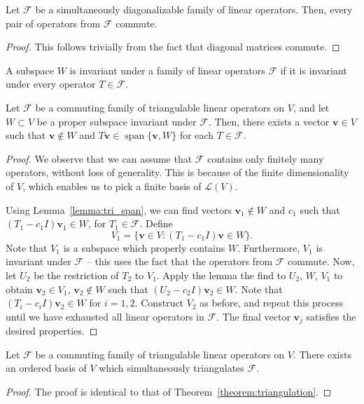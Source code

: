 \documentclass[11pt]{article}
\renewcommand{\vec}[1]{\boldsymbol{#1}}
\newcommand{\vv}{\vec{v}}
\newcommand{\alg}[1]{\mathscr{#1}}
\newcommand{\algL}{\alg{L}}
\newcommand{\algF}{\alg{F}}
\newcommand{\spn}{\operatorname{span}}
\theoremstyle{definition}
\theoremstyle{remark}
\numberwithin{equation}{section}
\begin{document}
    \begin{lemma}
        Let $\algF$ be a simultaneously diagonalizable family of linear
        operators. Then, every pair of operators from $\algF$ commute.
    \end{lemma}
    \begin{proof}
        This follows trivially from the fact that diagonal matrices commute.
    \end{proof}

    \begin{definition}
        A subspace $W$ is invariant under a family of linear operators $\algF$
        if it is invariant under every operator $T \in \algF$.
    \end{definition}

    \begin{lemma}
        Let $\algF$ be a commuting family of triangulable linear operators on
        $V$, and let $W \subset V$ be a proper subspace invariant under
        $\algF$. Then, there exists a vector $\vv \in V$ such that $\vv \notin
        W$ and $T\vv \in \spn\{\vv, W\}$ for each $T \in \algF$.
    \end{lemma}
    \begin{proof}
        We observe that we can assume that $\algF$ contains only finitely many
        operators, without loss of generality. This is because of the finite
        dimensionality of $V$, which enables us to pick a finite basis of $\algL(V)$.

        Using Lemma~\ref{lemma:tri_span}, we can find vectors $\vv_1 \notin W$ and
        $c_1$ such that $(T_1 - c_1I)\vv_1 \in W$, for $T_1 \in \algF$. Define
        \[
            V_1 = \{\vv \in V: (T_1 - c_1I)\vv \in W\}.
        \] Note that $V_1$ is a subspace which properly contains $W$. Furthermore,
        $V_1$ is invariant under $\algF$ -- this uses the fact that the operators
        from $\algF$ commute. Now, let $U_2$ be the restriction of $T_2$ to $V_1$.
        Apply the lemma the find to $U_2$, $W$, $V_1$ to obtain $\vv_2 \in V_1$,
        $\vv_2 \notin W$ such that $(U_2 - c_2I)\vv_2 \in W$. Note that $(T_i - c_i
        I) \vv_2 \in W$ for $i = 1, 2$. Construct $V_2$ as before, and repeat this
        process until we have exhausted all linear operators in $\algF$.  The final
        vector $\vv_j$ satisfies the desired properties.
    \end{proof}

    \begin{theorem}
        Let $\algF$ be a commuting family of triangulable linear operators on
        $V$. There exists an ordered basis of $V$ which simultaneously triangulates
        $\algF$.
    \end{theorem}
    \begin{proof}
        The proof is identical to that of Theorem~\ref{theorem:triangulation}.
    \end{proof}
    
\end{document}
